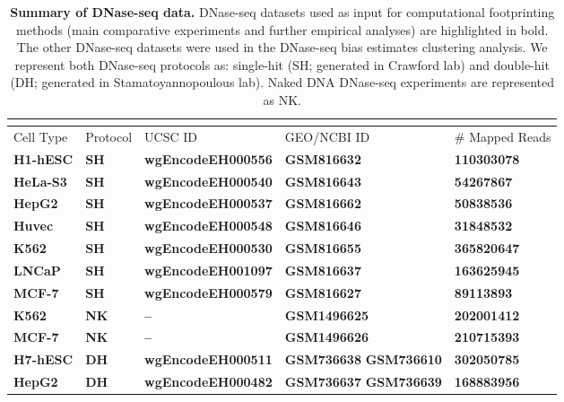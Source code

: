 \begin{longtable}{p{3.5cm}p{1.2cm}p{3.7cm}p{2.5cm}p{2.8cm}}
\caption[Summary of DNase-seq data]{\textbf{Summary of DNase-seq data.} DNase-seq datasets used as input for computational footprinting methods (main comparative experiments and further empirical analyses) are highlighted in bold. The other DNase-seq datasets were used in the DNase-seq bias estimates clustering analysis. We represent both DNase-seq protocols as: single-hit (SH; generated in Crawford lab) and double-hit (DH; generated in Stamatoyannopoulous lab). Naked DNA DNase-seq experiments are represented as NK.} \\
\label{tab:dataencode.dnase} \\[-0.8cm]
\hline
Cell Type & Protocol                 & UCSC ID             & GEO/NCBI ID                    & \# Mapped Reads \\
\hline
\textbf{H1-hESC} & \textbf{SH} & \textbf{wgEncodeEH000556} & \textbf{GSM816632} & \textbf{110303078} \\
\textbf{HeLa-S3} & \textbf{SH} & \textbf{wgEncodeEH000540} & \textbf{GSM816643} & \textbf{54267867} \\
\textbf{HepG2} & \textbf{SH} & \textbf{wgEncodeEH000537} & \textbf{GSM816662} & \textbf{50838536} \\
\textbf{Huvec} & \textbf{SH} & \textbf{wgEncodeEH000548} & \textbf{GSM816646} & \textbf{31848532} \\
\textbf{K562} & \textbf{SH} & \textbf{wgEncodeEH000530} & \textbf{GSM816655} & \textbf{365820647} \\
\textbf{LNCaP} & \textbf{SH} & \textbf{wgEncodeEH001097} & \textbf{GSM816637} & \textbf{163625945} \\
\textbf{MCF-7} & \textbf{SH} & \textbf{wgEncodeEH000579} & \textbf{GSM816627} & \textbf{89113893} \\
\textbf{K562} & \textbf{NK} & \textbf{--} & \textbf{GSM1496625} & \textbf{202001412} \\
\textbf{MCF-7} & \textbf{NK} & \textbf{--} & \textbf{GSM1496626} & \textbf{210715393} \\
\textbf{H7-hESC} & \textbf{DH} & \textbf{wgEncodeEH000511} & \textbf{GSM736638} \newline \textbf{GSM736610} & \textbf{302050785} \\
\textbf{HepG2} & \textbf{DH} & \textbf{wgEncodeEH000482} & \textbf{GSM736637} \newline \textbf{GSM736639} & \textbf{168883956} \\

\end{longtable}
